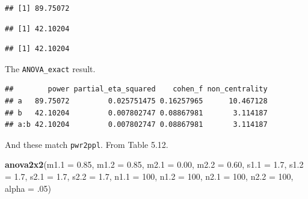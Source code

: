 \documentclass[]{book}
\newenvironment{Shaded}{\begin{snugshade}}{\end{snugshade}}
\newcommand{\DataTypeTok}[1]{\textcolor[rgb]{0.13,0.29,0.53}{#1}}
\newcommand{\DecValTok}[1]{\textcolor[rgb]{0.00,0.00,0.81}{#1}}
\newcommand{\FloatTok}[1]{\textcolor[rgb]{0.00,0.00,0.81}{#1}}
\newcommand{\KeywordTok}[1]{\textcolor[rgb]{0.13,0.29,0.53}{\textbf{#1}}}
\newcommand{\NormalTok}[1]{#1}
\newcommand{\OperatorTok}[1]{\textcolor[rgb]{0.81,0.36,0.00}{\textbf{#1}}}
\newcommand{\OtherTok}[1]{\textcolor[rgb]{0.56,0.35,0.01}{#1}}
\newcommand{\StringTok}[1]{\textcolor[rgb]{0.31,0.60,0.02}{#1}}
\begin{document}
\begin{verbatim}
## [1] 89.75072
\end{verbatim}

\begin{Shaded}
\end{Shaded}

\begin{verbatim}
## [1] 42.10204
\end{verbatim}

\begin{Shaded}
\end{Shaded}

\begin{verbatim}
## [1] 42.10204
\end{verbatim}

The \texttt{ANOVA\_exact} result.

\begin{Shaded}
\end{Shaded}

\begin{verbatim}
##        power partial_eta_squared    cohen_f non_centrality
## a   89.75072         0.025751475 0.16257965      10.467128
## b   42.10204         0.007802747 0.08867981       3.114187
## a:b 42.10204         0.007802747 0.08867981       3.114187
\end{verbatim}

And these match \texttt{pwr2ppl}. From Table 5.12.

\begin{Shaded}
\begin{Highlighting}[]
\KeywordTok{anova2x2}\NormalTok{(}\DataTypeTok{m1.1 =} \FloatTok{0.85}\NormalTok{, }\DataTypeTok{m1.2 =} \FloatTok{0.85}\NormalTok{, }\DataTypeTok{m2.1 =} \FloatTok{0.00}\NormalTok{, }\DataTypeTok{m2.2 =} \FloatTok{0.60}\NormalTok{,}
         \DataTypeTok{s1.1 =} \FloatTok{1.7}\NormalTok{, }\DataTypeTok{s1.2 =} \FloatTok{1.7}\NormalTok{, }\DataTypeTok{s2.1 =} \FloatTok{1.7}\NormalTok{, }\DataTypeTok{s2.2 =} \FloatTok{1.7}\NormalTok{,}
         \DataTypeTok{n1.1 =} \DecValTok{100}\NormalTok{, }\DataTypeTok{n1.2 =} \DecValTok{100}\NormalTok{, }\DataTypeTok{n2.1 =} \DecValTok{100}\NormalTok{, }\DataTypeTok{n2.2 =} \DecValTok{100}\NormalTok{,}
         \DataTypeTok{alpha =} \FloatTok{.05}\NormalTok{)}
\end{Highlighting}
\end{Shaded}
\end{document}
